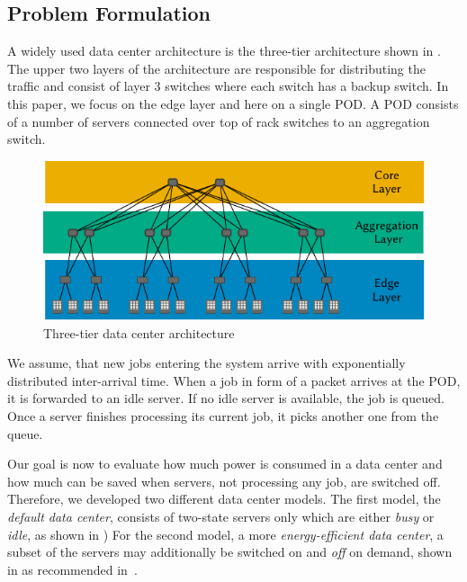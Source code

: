 \subsection{Problem Formulation}\label{sec:cloud:data_centers:problem_formulation}

A widely used data center architecture is the three-tier architecture shown in .
The upper two layers of the architecture are responsible for distributing the traffic and consist of layer 3 switches where each switch has a backup switch.
In this paper, we focus on the edge layer and here on a single \gls{POD}.
A \gls{POD} consists of a number of servers connected over top of rack switches to an aggregation switch.

\begin{figure}
  \centering
  \includegraphics{cloud/data_centers/problem_formulation/figures/architecture}
  \caption{Three-tier data center architecture}
  \label{fig:sec:cloud:data_centers:problem_formulation:3-tier_datacenter}
\end{figure}


We assume, that new jobs entering the system arrive with exponentially distributed inter-arrival time.
When a job in form of a packet arrives at the \gls{POD}, it is forwarded to an idle server.
If no idle server is available, the job is queued.
Once a server finishes processing its current job, it picks another one from the queue.

Our goal is now to evaluate how much power is consumed in a data center and how much can be saved when servers, not processing any job, are switched off.
Therefore, we developed two different data center models.
The first model, the \emph{default data center}, consists of two-state servers only which are either \emph{busy} or \emph{idle}, as shown in ) 
For the second model, a more \emph{energy-efficient data center}, a subset of the servers may additionally be switched on and \emph{off} on demand, shown in  as recommended in~\cite{EPA2007}.

